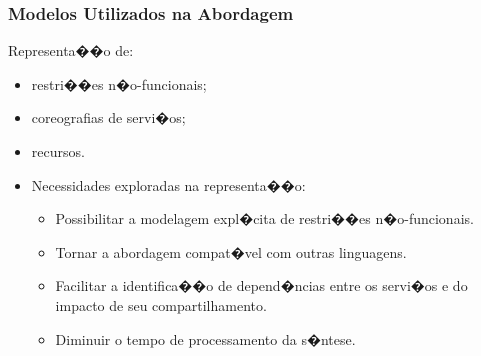 \documentclass[compress]{beamer}
\newcommand{\semitransp}[2][35]{\textcolor{fg!#1}#2}
\begin{document}
\frame
{
 \frametitle{Modelos Utilizados na Abordagem}
\begin{block}{Representa��o de:}
\footnotesize
\begin{itemize}
 \item[\textcolor{fg!20}{\textbullet}] \semitransp[20]{{restri��es n�o-funcionais;}}
 \item coreografias de servi�os;
 \item[\textcolor{fg!20}{\textbullet}] \semitransp[20]{{recursos.}}
\end{itemize}
\end{block} 
\vspace{0.8cm}
\begin{itemize}
 \item Necessidades exploradas na representa��o:
\begin{itemize}
 \item[\textcolor{fg!20}{\textbullet}] \semitransp[20]{{Possibilitar a modelagem expl�cita de restri��es n�o-funcionais.}}
 \item Tornar a abordagem compat�vel com outras linguagens.
 \item Facilitar a identifica��o de depend�ncias entre os servi�os e do impacto de seu compartilhamento.
 \item[\textcolor{fg!20}{\textbullet}] \semitransp[20]{{Diminuir o tempo de processamento da s�ntese.}}
\end{itemize}
\end{itemize}
}
\end{document}
